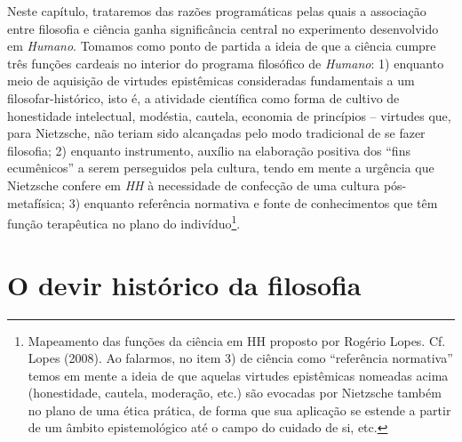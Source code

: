 \documentclass[
	12pt,				%
	openright,			%
	oneside,			%
	a4paper,			%
	english,			%
	french,				%
	spanish,			%
	brazil				%
	]{abntex2}
\newcommand{\Hum}{\textit{Humano}\xspace}
\begin{document}
	Neste capítulo, trataremos das razões programáticas pelas quais a associação entre filosofia e ciência ganha significância central no experimento desenvolvido em \Hum. Tomamos como ponto de partida a ideia de que a ciência cumpre três funções cardeais no interior do programa filosófico de \Hum: 1) enquanto meio de aquisição de virtudes epistêmicas consideradas fundamentais a um filosofar-histórico, isto é, a atividade científica como forma de cultivo de honestidade intelectual, modéstia, cautela, economia de princípios – virtudes que, para Nietzsche, não teriam sido alcançadas pelo modo tradicional de se fazer filosofia; 2) enquanto instrumento, auxílio na elaboração positiva dos “fins ecumênicos” a serem perseguidos pela cultura, tendo em mente a urgência que Nietzsche confere em \textit{HH} à necessidade de confecção de uma cultura pós-metafísica; 3) enquanto referência normativa e fonte de conhecimentos que têm função terapêutica no plano do indivíduo\footnote{Mapeamento das funções da ciência em HH proposto por Rogério Lopes. Cf. Lopes (2008). Ao falarmos, no item 3) de ciência como “referência normativa” temos em mente a ideia de que aquelas virtudes epistêmicas nomeadas acima (honestidade, cautela, moderação, etc.) são evocadas por Nietzsche também no plano de uma ética prática, de forma que sua aplicação se estende a partir de um âmbito epistemológico até o campo do cuidado de si, etc.}.

\section{O devir histórico da filosofia}
\end{document}
